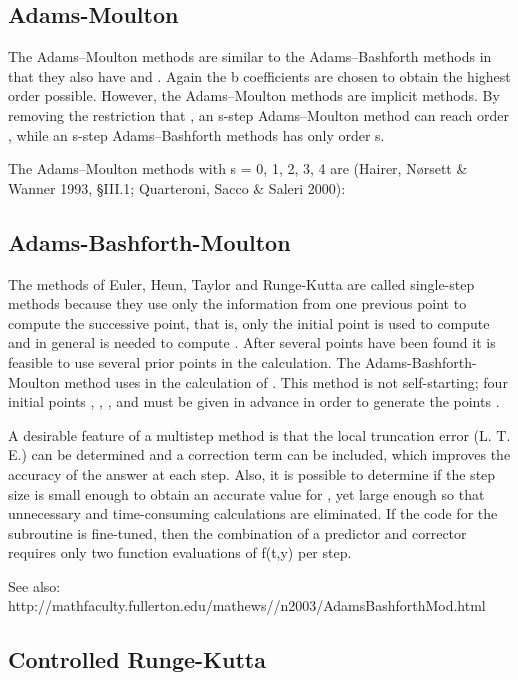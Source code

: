 \subsection{Adams-Moulton}
\label{Adams-Moulton}

The Adams–Moulton methods are similar to the Adams–Bashforth methods in that they also have  and . Again the b coefficients are chosen to obtain the highest order possible. However, the Adams–Moulton methods are implicit methods. By removing the restriction that , an s-step Adams–Moulton method can reach order , while an s-step Adams–Bashforth methods has only order s.

The Adams–Moulton methods with s = 0, 1, 2, 3, 4 are (Hairer, Nørsett \& Wanner 1993, §III.1; Quarteroni, Sacco \& Saleri 2000):




\subsection{Adams-Bashforth-Moulton}
\label{Adams-Bashforth-Moulton}

The methods of Euler, Heun, Taylor and Runge-Kutta are called single-step methods because they use only the information from one previous point to compute the successive point, that is, only the initial point    is used to compute    and in general    is needed to compute  .  After several points have been found it is feasible to use several prior points in the calculation.  The Adams-Bashforth-Moulton method uses   in the calculation of .  This method is not self-starting;  four initial points  , , ,  and  must be given in advance in order to generate the points .  

    A desirable feature of a multistep method is that the local truncation error (L. T. E.) can be determined and a correction term can be included, which improves the accuracy of the answer at each step.  Also, it is possible to determine if the step size is small enough to obtain an accurate value for  , yet large enough so that unnecessary and time-consuming calculations are eliminated.  If the code for the subroutine is fine-tuned, then the combination of a  predictor and corrector requires only two function evaluations of  f(t,y)  per step. 

See also: http://mathfaculty.fullerton.edu/mathews//n2003/AdamsBashforthMod.html


\subsection{Controlled Runge-Kutta}
\label{Controlled Runge-Kutta}

